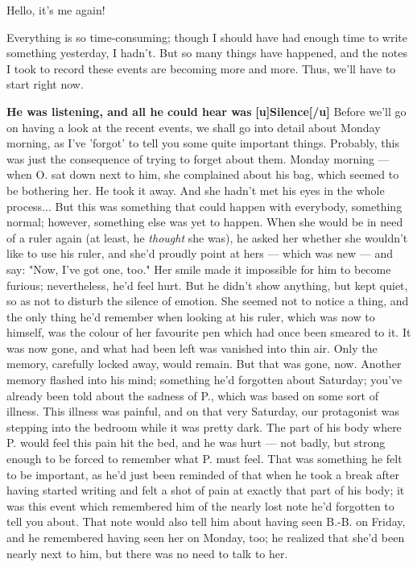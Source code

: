Hello, it's me again!

Everything is so time-consuming; though I should have had enough time to write something yesterday, I hadn't. But so many things have happened, and the notes I took to record these events are becoming more and more. 
Thus, we'll have to start right now. 

\textbf{He was listening, and all he could hear was}
\textbf{[u]Silence[/u]}
Before we'll go on having a look at the recent events, we shall go into detail about Monday morning, as I've 'forgot' to tell you some quite important things. Probably, this was just the consequence of trying to forget about them. 
Monday morning --- when O. sat down next to him, she complained about his bag, which seemed to be bothering her. He took it away. And she hadn't met his eyes in the whole process...
But this was something that could happen with everybody, something normal; however, something else was yet to happen. When she would be in need of a ruler again (at least, he \emph{thought} she was), he asked her whether she wouldn't like to use his ruler, and she'd proudly point at hers --- which was new --- and say: "Now, I've got one, too." Her smile made it impossible for him to become furious; nevertheless, he'd feel hurt. But he didn't show anything, but kept quiet, so as not to disturb the silence of emotion. She seemed not to notice a thing, and the only thing he'd remember when looking at his ruler, which was now to himself, was the colour of her favourite pen which had once been smeared to it. 
It was now gone, and what had been left was vanished into thin air. Only the memory, carefully locked away, would remain. 
But that was gone, now. Another memory flashed into his mind; something he'd forgotten about Saturday; you've already been told about the sadness of P., which was based on some sort of illness. This illness was painful, and on that very Saturday, our protagonist was stepping into the bedroom while it was pretty dark. The part of his body where P. would feel this pain hit the bed, and he was hurt --- not badly, but strong enough to be forced to remember what P. must feel. That was something he felt to be important, as he'd just been reminded of that when he took a break after having started writing and felt a shot of pain at exactly that part of his body; it was this event which remembered him of the nearly lost note he'd forgotten to tell you about. 
That note would also tell him about having seen B.-B. on Friday, and he remembered having seen her on Monday, too; he realized that she'd been nearly next to him, but there was no need to talk to her. 
